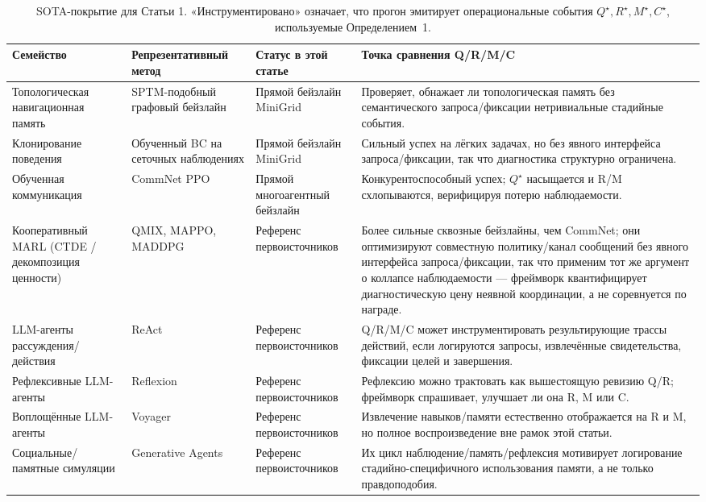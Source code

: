 \documentclass{article}
\begin{document}
\begin{table}[h]
\caption{SOTA-покрытие для Статьи 1. «Инструментировано» означает, что прогон эмитирует операциональные события $Q^\star,R^\star,M^\star,C^\star$, используемые Определением~1.}
\label{p1:tab:sota-coverage}
\centering
\small
\begin{tabular}{p{2.45cm}p{2.55cm}p{2.7cm}p{4.0cm}}
\toprule
Семейство & Репрезентативный метод & Статус в этой статье & Точка сравнения Q/R/M/C \\
\midrule
Топологическая навигационная память & SPTM-подобный графовый бейзлайн \citep{savinov2018semi} & Прямой бейзлайн MiniGrid & Проверяет, обнажает ли топологическая память без семантического запроса/фиксации нетривиальные стадийные события. \\
Клонирование поведения & Обученный BC на сеточных наблюдениях & Прямой бейзлайн MiniGrid & Сильный успех на лёгких задачах, но без явного интерфейса запроса/фиксации, так что диагностика структурно ограничена. \\
Обученная коммуникация & CommNet PPO \citep{sukhbaatar2016commnet,schulman2017proximal} & Прямой многоагентный бейзлайн & Конкурентоспособный успех; $Q^\star$ насыщается и R/M схлопываются, верифицируя потерю наблюдаемости. \\
Кооперативный MARL (CTDE / декомпозиция ценности) & QMIX, MAPPO, MADDPG \citep{rashid2018qmix,yu2022mappo,lowe2017maddpg} & Референс первоисточников & Более сильные сквозные бейзлайны, чем CommNet; они оптимизируют совместную политику/канал сообщений без явного интерфейса запроса/фиксации, так что применим тот же аргумент о коллапсе наблюдаемости --- фреймворк квантифицирует диагностическую цену неявной координации, а не соревнуется по награде. \\
LLM-агенты рассуждения/действия & ReAct \citep{yao2022react} & Референс первоисточников & Q/R/M/C может инструментировать результирующие трассы действий, если логируются запросы, извлечённые свидетельства, фиксации целей и завершения. \\
Рефлексивные LLM-агенты & Reflexion \citep{shinn2023reflexion} & Референс первоисточников & Рефлексию можно трактовать как вышестоящую ревизию Q/R; фреймворк спрашивает, улучшает ли она R, M или C. \\
Воплощённые LLM-агенты & Voyager \citep{wang2023voyager} & Референс первоисточников & Извлечение навыков/памяти естественно отображается на R и M, но полное воспроизведение вне рамок этой статьи. \\
Социальные/памятные симуляции & Generative Agents \citep{park2023generative} & Референс первоисточников & Их цикл наблюдение/память/рефлексия мотивирует логирование стадийно-специфичного использования памяти, а не только правдоподобия. \\

\end{tabular}
\end{table}
\end{document}
